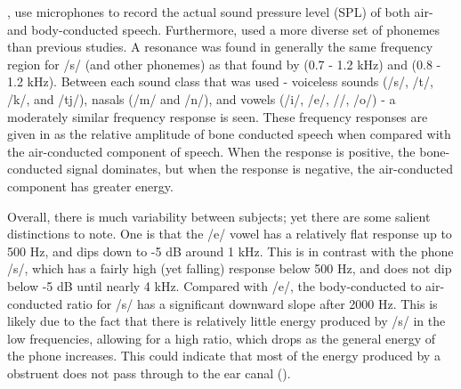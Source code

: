 \cite{reinfeldt:10}, use microphones to record the actual sound pressure level (SPL) of both air- and body-conducted speech. Furthermore, \cite{reinfeldt:10} used a more diverse set of phonemes than previous studies.  A resonance was found in generally the same frequency region for /s/ (and other phonemes) as that found by \cite{porschmann:00} (0.7 - 1.2 kHz) and \cite{hakansson:94} (0.8 - 1.2 kHz). %
Between each sound class that was used - voiceless sounds (/s/, /t/, /k/, and /tj/),  nasals (/m/ and /n/), and vowels (/i/, /e/, //, /o/) - a moderately similar frequency response is seen. %
These frequency responses are given in \cite{reinfeldt:10} as the relative amplitude of bone conducted speech when compared with the air-conducted component of speech.  When the response is positive, the bone-conducted signal dominates, but when the response is negative, the air-conducted component has greater energy.


Overall, there is much variability between subjects; yet there are some salient distinctions to note.  One is that the /e/ vowel has a relatively flat response up to 500 Hz, and dips down to -5 dB around 1 kHz.  This is in contrast with the phone /s/, which has a fairly high (yet falling) response below 500 Hz, and does not dip below -5 dB until nearly 4 kHz.  Compared with /e/, the body-conducted to air-conducted ratio for /s/ has a significant downward slope after 2000 Hz.  This is likely due to the fact that there is relatively little energy produced by /s/ in the low frequencies, allowing for a high ratio, which drops as the general energy of the phone increases.  This could indicate that most of the energy produced by a obstruent does not pass through to the ear canal (\cite{reinfeldt:10}).

